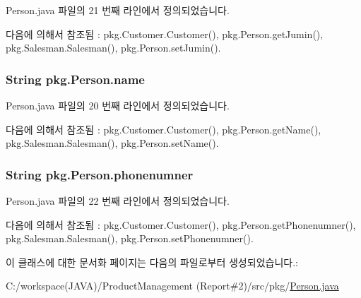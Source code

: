 Person.\+java 파일의 21 번째 라인에서 정의되었습니다.



다음에 의해서 참조됨 \+:  pkg.\+Customer.\+Customer(), pkg.\+Person.\+get\+Jumin(), pkg.\+Salesman.\+Salesman(), pkg.\+Person.\+set\+Jumin().

\subsubsection[{\texorpdfstring{name}{name}}]{\setlength{\rightskip}{0pt plus 5cm}String pkg.\+Person.\+name\hspace{0.3cm}{\ttfamily [protected]}}\hypertarget{classpkg_1_1_person_a37fd1fe3cf039df98ffca54df6002bb6}{}\label{classpkg_1_1_person_a37fd1fe3cf039df98ffca54df6002bb6}


Person.\+java 파일의 20 번째 라인에서 정의되었습니다.



다음에 의해서 참조됨 \+:  pkg.\+Customer.\+Customer(), pkg.\+Person.\+get\+Name(), pkg.\+Salesman.\+Salesman(), pkg.\+Person.\+set\+Name().

\subsubsection[{\texorpdfstring{phonenumner}{phonenumner}}]{\setlength{\rightskip}{0pt plus 5cm}String pkg.\+Person.\+phonenumner\hspace{0.3cm}{\ttfamily [protected]}}\hypertarget{classpkg_1_1_person_aa7a67349f91a08a8cc45067354653c1d}{}\label{classpkg_1_1_person_aa7a67349f91a08a8cc45067354653c1d}


Person.\+java 파일의 22 번째 라인에서 정의되었습니다.



다음에 의해서 참조됨 \+:  pkg.\+Customer.\+Customer(), pkg.\+Person.\+get\+Phonenumner(), pkg.\+Salesman.\+Salesman(), pkg.\+Person.\+set\+Phonenumner().



이 클래스에 대한 문서화 페이지는 다음의 파일로부터 생성되었습니다.\+:\begin{DoxyCompactItemize}
\item 
C\+:/workspace(\+J\+A\+V\+A)/\+Product\+Management (\+Report\#2)/src/pkg/\hyperlink{_person_8java}{Person.\+java}\end{DoxyCompactItemize}
